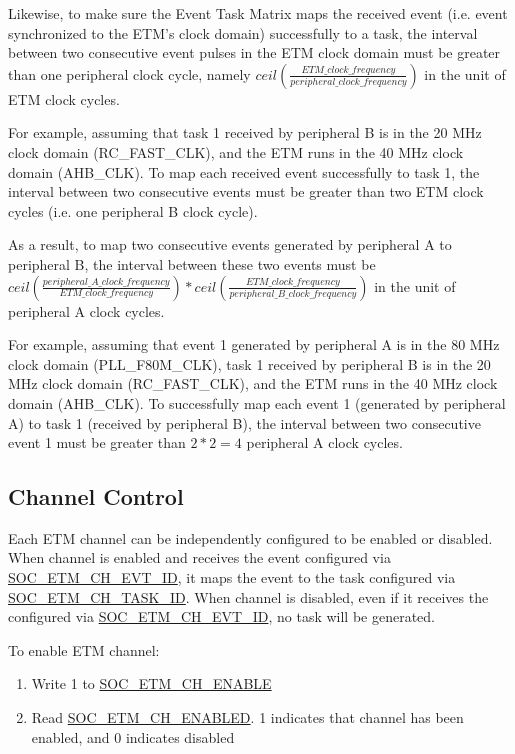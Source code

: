 \documentclass[main\_\_EN.tex]{subfiles}
\begin{document}
Likewise, to make sure the Event Task Matrix maps the received event (i.e. event synchronized to the ETM's clock domain) successfully to a task, the interval between two consecutive event pulses in the ETM clock domain must be greater than one peripheral clock cycle, namely $ceil(\frac{ETM\_clock\_frequency}{peripheral\_clock\_frequency})$ in the unit of ETM clock cycles.

For example, assuming that task 1 received by peripheral B is in the 20 MHz clock domain (RC\_FAST\_CLK), and the ETM runs in the 40 MHz clock domain (AHB\_CLK). To map each received event successfully to task 1, the interval between two consecutive events must be greater than two ETM clock cycles (i.e. one peripheral B clock cycle).

As a result, to map two consecutive events generated by peripheral A to peripheral B, the interval between these two events must be $ceil(\frac{peripheral\_A\_clock\_frequency}{ETM\_clock\_frequency})*ceil(\frac{ETM\_clock\_frequency}{peripheral\_B\_clock\_frequency})$ in the unit of peripheral A clock cycles.

For example, assuming that event 1 generated by peripheral A is in the 80 MHz clock domain (PLL\_F80M\_CLK), task 1 received by peripheral B is in the 20 MHz clock domain (RC\_FAST\_CLK), and the ETM runs in the 40 MHz clock domain (AHB\_CLK). To successfully map each event 1 (generated by peripheral A) to task 1 (received by peripheral B), the interval between two consecutive event 1 must be greater than $2*2=4$ peripheral A clock cycles.



\subsection{Channel Control}
\label{sec:evntaskmatrix-channel-enable}
Each ETM channel can be independently configured to be enabled or disabled. When channel is enabled and receives the event configured via \hyperref[fielddesc:SOCETMCH0EVTID]{SOC\_ETM\_CH\_EVT\_ID}, it maps the event to the task configured via \hyperref[fielddesc:SOCETMCH0TASKID]{SOC\_ETM\_CH\_TASK\_ID}. When channel is disabled, even if it receives the configured via \hyperref[fielddesc:SOCETMCH0EVTID]{SOC\_ETM\_CH\_EVT\_ID}, no task will be generated.

To enable ETM channel:
\begin{enumerate}
    \item Write 1 to \hyperref[fielddesc:SOCETMCHENABLE0]{SOC\_ETM\_CH\_ENABLE}
    \item Read \hyperref[fielddesc:SOCETMCHENABLED0]{SOC\_ETM\_CH\_ENABLED}. 1 indicates that channel has been enabled, and 0 indicates disabled
\end{enumerate}
\end{document}
